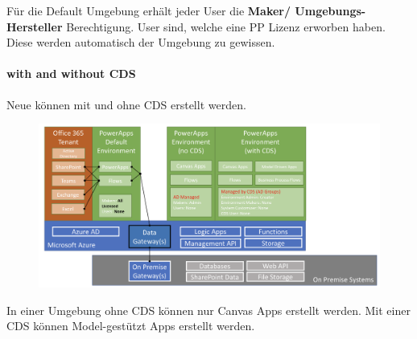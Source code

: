 Für die Default Umgebung erhält jeder User die \textbf{\Env Maker/ Umgebungs-Hersteller} Berechtigung. User sind, welche eine \gls{PP} Lizenz erworben haben. Diese werden automatisch der Umgebung zu gewissen. 

\paragraph*{\Env with and without CDS}\label{par: \Env with and without CDS} 
Neue \Env können mit und ohne \gls{CDS} erstellt werden. 
\begin{figure}[H]
	\centering
	\includegraphics[scale = 0.3]{attachment/chapter_13/Scc009}
\end{figure}
In einer Umgebung ohne \gls{CDS} können nur Canvas Apps erstellt werden. Mit einer \gls{CDS} können Model-gestützt Apps erstellt werden.


